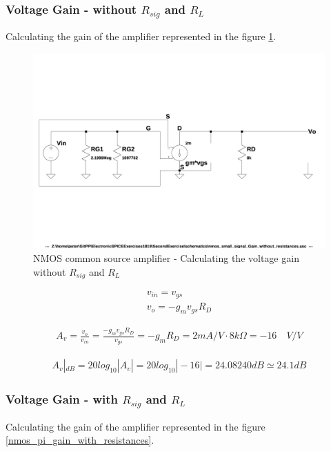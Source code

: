 \documentclass[10pt,a4paper]{book}
\begin{document}
\subsubsection{Voltage Gain - without $R_{sig}$ and $R_L$}
Calculating the gain of the amplifier represented in the figure \ref{nmos_pi_gain_without_resistances}.

\begin{figure}[h]
  \centering
  \includegraphics[width=12cm]{schematics/nmos_small_signal_without_resistances.jpg}
  \caption{NMOS common source amplifier - Calculating the voltage gain without $R_{sig}$ and $R_L$}
  \label{nmos_pi_gain_without_resistances}
\end{figure}

\begin{align}
v_{in} = v_{gs}\\
v_{o} = - g_m v_{gs} R_D
\end{align}

\begin{align}
A_v = \frac{v_o}{v_{in}} = \frac{- g_m v_{gs} R_D}{v_{gs}} = - g_m R_D = 2mA/V \cdot 8k\Omega = -16 \quad V/V
\end{align}

\begin{align}
A_v|_{dB} = 20 log_{10} |A_v| = 20 log_{10} |-16| = 24.08240 dB \simeq 24.1 dB
\end{align}

\subsubsection{Voltage Gain - with $R_{sig}$ and $R_L$}
Calculating the gain of the amplifier represented in the figure \ref{nmos_pi_gain_with_resistances}.
\end{document}
